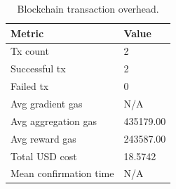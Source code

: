 \begin{table}[t]
\centering
\caption{Blockchain transaction overhead.}
\label{tab:blockchain_overhead}
\begin{tabular}{ll}
\hline
Metric & Value \\
\hline
Tx count & 2 \\
Successful tx & 2 \\
Failed tx & 0 \\
Avg gradient gas & N/A \\
Avg aggregation gas & 435179.00 \\
Avg reward gas & 243587.00 \\
Total USD cost & 18.5742 \\
Mean confirmation time & N/A \\
\hline
\end{tabular}
\end{table}
